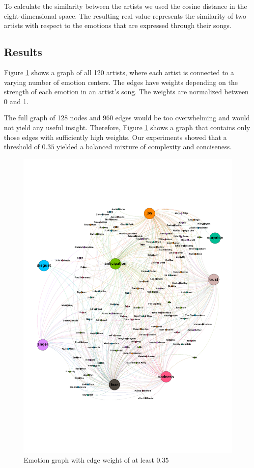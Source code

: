 \documentclass[10pt,a4paper]{article}
\begin{document}
	To calculate the similarity between the artists we used the cosine distance in the eight-dimensional space. The resulting real value represents the similarity of two artists with respect to the emotions that are expressed through their songs.
	
		\subsection{Results}
		Figure \ref{fig:emotiongraph} shows a graph of all 120 artists, where each artist is connected to a varying number of emotion centers. The edges have weights depending on the strength of each emotion in an artist's song. The weights are normalized between 0 and 1.
		
		The full graph of 128 nodes and 960 edges would be too overwhelming and would not yield any useful insight. Therefore, Figure \ref{fig:emotiongraph} shows a graph that contains only those edges with sufficiently high weights. Our experiments showed that a threshold of $0.35$ yielded a balanced mixture of complexity and conciseness.
		
		\begin{figure}[htb]
			\centering
			\includegraphics[trim=0mm 50mm 0mm 50mm, clip, width=\linewidth]{data/emotion_graph}
			\caption{Emotion graph with edge weight of at least $0.35$}
			\label{fig:emotiongraph}
		\end{figure}
		
\end{document}
